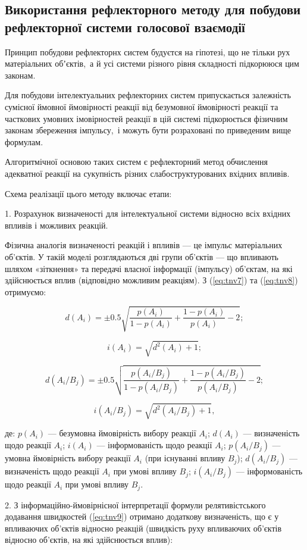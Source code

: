 \subsection{Використання рефлекторного методу для побудови рефлекторної системи голосової взаємодії} \label{subsect2_4_2}

Принцип побудови рефлекторнх систем будуєтся на гіпотезі, що не тільки рух матеріальних обʼєктів, а й усі системи різного рівня складності підкорююся цим законам.

Для побудови інтелектуальних рефлекторних систем припускається залежність сумісної ймовної ймовірності реакції від безумовної ймовірності реакції та часткових умовних імовірностей реакції в цій системі підкорюється фізичним законам збереження імпульсу, і можуть бути розраховані по приведеним вище формулам.

Алгоритмічної основою таких систем є рефлекторний метод обчислення адекватної реакції на сукупність різних слабоструктурованих вхідних впливів.

Схема реалізації цього методу включає етапи:

1. Розрахунок визначеності для інтелектуальної системи відносно всіх вхідних впливів і можливих реакцій.

Фізична аналогія визначеності реакцій і впливів --- це імпульс матеріальних об'єктів. У такій моделі розглядаються дві групи об'єктів --- що впливають шляхом «зіткнення» та передачі власної інформації (імпульсу) об'єктам, на які здійснюється вплив (відповідно можливим реакціям). З (\ref{eq:tnv7}) та (\ref{eq:tnv8}) отримуємо:

\[
d(A_i)=\pm0.5\sqrt{\frac{p(A_i)}{1-p(A_i)}+\frac{1-p(A_i)}{p(A_i)}-2};
\]

\[
i(A_i)=\sqrt{d^2(A_i)+1};
\]

\[
d(A_i/B_j)=\pm0.5\sqrt{\frac{p(A_i/B_j)}{1-p(A_i/B_j)}+\frac{1-p(A_i/B_j)}{p(A_i/B_j)}-2};
\]

\[
i(A_i/B_j)=\sqrt{d^2(A_i/B_j)+1},
\]

\noindent
де: $p(A_i)$ --- безумовна ймовірність вибору реакції $A_i$; $d(A_i)$ --- визначеність щодо реакції $A_i$; $i(A_i)$ --- інформованість щодо реакції $A_i$; $p(A_i/B_j)$ --- умовна ймовірність вибору реакції $A_i$ (при існуванні впливу $B_j$); $d(A_i/B_j)$ --- визначеність щодо реакції $A_i$ при умові впливу $B_j$; $i(A_i/B_j)$ --- інформованість щодо реакції $A_i$ при умові впливу $B_j$.

2. З інформаційно-ймовірнісної інтерпретації формули релятивістського додавання швидкостей (\ref{eq:tnv9}) отримано додаткову визначеність, що є у впливаючих об'єктів відносно реакцій (швидкість руху впливаючих об'єктів відносно об'єктів, на які здійснюється вплив):

